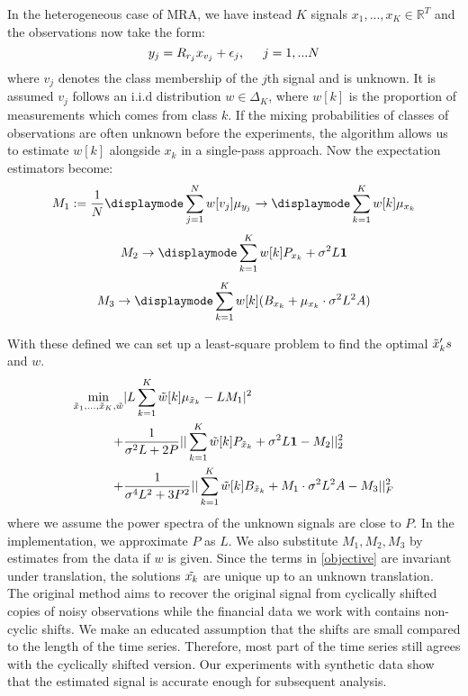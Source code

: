 \documentclass[sigconf]{acmart}
\begin{document}
    In the heterogeneous case of MRA, we have instead $K$ signals $x_1, ..., x_K \in \mathbb
    {R}^T$ and the observations now take the form:
    $$y_j = R_{r_j}x_{v_j} + \epsilon_j, \hspace{.5cm} j = 1,...N$$
    where $v_j$ denotes the class membership of the $j$th signal and is unknown. It is assumed $v_j$ follows an i.i.d distribution $w \in \Delta_K$, where $w[k]$ is the proportion of measurements which comes from class $k$. If the mixing probabilities of classes of observations are often unknown before the experiments, the algorithm allows us to estimate $w[k]$ alongside $x_k$ in a single-pass approach. Now the expectation estimators become:
    \begin{equation}
    M_1 := \frac{1}{N}\displaymode\sum_{j=1}^{N}w[v_j]\mu_{y_j} \rightarrow \displaymode\sum_{k=1}^{K}w[k]\mu_{x_k}
\end{equation}
    \begin{equation}
    M_2 \rightarrow \displaymode\sum_{k=1}^{K}w[k]P_{x_k} + \sigma^2L\mathbf{1}
\end{equation}
\begin{equation}
    M_3 \rightarrow \displaymode\sum_{k=1}^{K}w[k](B_{x_k} + \mu_{x_k}\cdot\sigma^2L^2A)
\end{equation}

With these defined we can set up a least-square problem to find the optimal $\Tilde{x}_k's$ and $w$.
\begin{equation}
    \label{objective}
    \begin{split}
        \min_{\Tilde{x}_1,...,\Tilde{x}_K, 
        \Tilde{w}} &|L\sum_{k=1}^K\Tilde{w}[k]\mu_{\Tilde{x}_k}-LM_1|^2\\
        +&\frac{1}{\sigma^2L +2P}||\sum_{k=1}^K\Tilde{w}[k]P_{\Tilde{x}_k} + \sigma^2L\mathbf{1}-M_2||^2_2 \\
        +&\frac{1}{\sigma^4L^2 + 3P^2}||\sum_{k=1}^K\Tilde{w}[k]B_{\Tilde{x}_k}+M_1\cdot \sigma^2L^2A-M_3||^2_F
    \end{split}
\end{equation}
where we assume the power spectra of the unknown signals are close to $P$. In the implementation, we approximate $P$ as $L$. We also substitute $M_1, M_2, M_3$ by estimates from the data if $w$ is given. Since the terms in \ref{objective} are invariant under translation, the solutions $\Tilde{x_k}$ are unique up to an unknown translation.\\

The original method aims to recover the original signal from cyclically shifted copies of noisy observations while the financial data we work with contains non-cyclic shifts. We make an educated assumption that the shifts are small compared to the length of the time series. Therefore, most part of the time series still agrees with the cyclically shifted version. Our experiments with synthetic data show that the estimated signal is accurate enough for subsequent analysis. 
\end{document}
